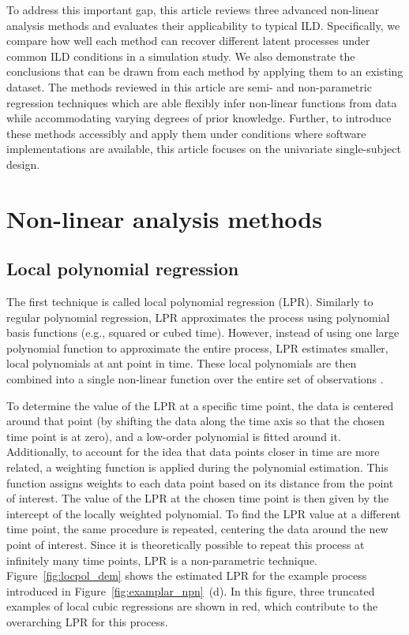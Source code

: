 \documentclass[man, floatsintext]{apa7}
\begin{document}
To address this important gap, this article reviews three advanced non-linear
analysis methods and evaluates their applicability to typical ILD.\@
Specifically, we compare how well each method can recover different latent
processes under common ILD conditions in a simulation study. We also
demonstrate the conclusions that can be drawn from each method by applying them
to an existing dataset. The methods reviewed in this article are semi- and
non-parametric regression techniques which
are able flexibly infer non-linear functions from data
while accommodating varying degrees of prior knowledge.
Further, to introduce these methods accessibly and apply them under
conditions where software implementations are available, this article
focuses on the univariate single-subject design.

\section{Non-linear analysis methods}

\subsection{Local polynomial regression}

The first technique is called local polynomial regression (LPR). Similarly to
regular polynomial regression, LPR approximates the process using polynomial
basis functions (e.g., squared or cubed time). However, instead of using one
large polynomial function to approximate the entire process, LPR estimates
smaller, local polynomials at ant point in time. These local polynomials are
then combined into a single non-linear function over the entire set of
observations
\parencite{fan_adaptive_1995, ruppert_multivariate_1994, fan_local_2018}.

To determine the value of the LPR at a specific time point, the data is
centered around that point (by shifting the data along the time axis so
that the chosen time point is at zero), and a low-order polynomial is fitted
around it. Additionally, to account for the idea that data points closer in
time are more related, a weighting function is applied during the polynomial
estimation. This function assigns weights to each data point based on its
distance from the point of interest. The value of the LPR at the chosen
time point is then given by the intercept of the locally weighted polynomial.
To find the LPR value at a different time
point, the same procedure is repeated, centering the data around the new point
of interest. Since it is theoretically possible to repeat this process at
infinitely many
time points, LPR is a non-parametric technique. Figure~\ref{fig:locpol_dem}
shows the estimated LPR for the example process introduced in
Figure~\ref{fig:examplar_npn}~(d).  In this figure, three truncated examples of
local cubic regressions are shown
in red, which contribute to the overarching LPR for this process.\@
\end{document}
